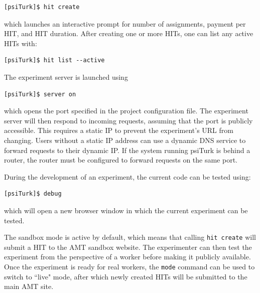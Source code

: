 \documentclass[twocolumn]{svjour3}          %
\begin{document}
\begin{lstlisting}
[psiTurk]$ hit create
\end{lstlisting}

\noindent which launches an interactive prompt for number of assignments, payment per HIT, and HIT duration. After creating one or more HITs, one can list any active HITs with:

\begin{lstlisting}
[psiTurk]$ hit list --active
\end{lstlisting}

The experiment server is launched using

\begin{lstlisting}
[psiTurk]$ server on
\end{lstlisting}

\noindent which opens the port specified in the project configuration file.
The experiment server will then respond to incoming requests, assuming that the port is publicly accessible.
This requires a static IP to prevent the experiment's URL from changing.
Users without a static IP address can use a dynamic DNS service to forward requests to their dynamic IP.
If the system running psiTurk is behind a router, the router must be configured to forward requests on the same port.

During the development of an experiment, the current code can be tested using:

\begin{lstlisting}
[psiTurk]$ debug
\end{lstlisting}

\noindent which will open a new browser window in which the current experiment can be tested.


The sandbox mode is active by default, which means that calling \texttt{hit create} will submit a HIT to the AMT sandbox website.
The experimenter can then test the experiment from the perspective of a worker before making it publicly available.
Once the experiment is ready for real workers, the \texttt{mode} command can be used to switch to ``live" mode, after which newly created HITs will be submitted to the main AMT site.
\end{document}
